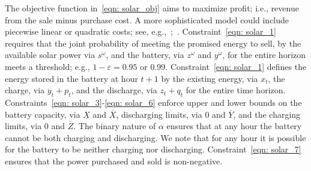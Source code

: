 \documentclass[opre,nonblindrev]{informs3} %
\begin{document}
The objective function in~\eqref{eqn: solar_obj} aims to maximize profit; i.e., revenue from the sale
minus purchase cost. A more sophisticated model could include piecewise linear or quadratic costs; see, e.g.,~\cite{carrion2006};~\cite{wu2011tighter}. Constraint~\eqref{eqn: solar_1} requires that the
joint probability of meeting the promised energy to sell, by the available solar power via $s^\omega$, and the battery, via  $z^\omega$ and $y^\omega$,  for the entire horizon meets a threshold; e.g., $1-\varepsilon = 0.95$ or 0.99. Constraint~\eqref{eqn: solar_1} defines the energy stored in the battery at hour $t+1$ by the existing energy, via $x_t$, the charge, via $y_t + p_t$, and the discharge, via $z_t + q_t$ for the entire time horizon. Constraints~\eqref{eqn: solar_3}-\eqref{eqn: solar_6} enforce upper and lower bounds on the battery capacity, via $\underline{X}$ and $\overline{X}$, discharging limits, via $0$ and $\overline{Y}$, and the charging limits, via $0$ and $\overline{Z}$.  The binary nature of $\alpha$ ensures that at any hour the battery cannot be both charging and discharging. We note that for any hour it is possible for the battery to be neither charging nor discharging.  Constraint~\eqref{eqn: solar_7} ensures that the power purchased and sold is non-negative.





	
	
	
	
\end{document}
